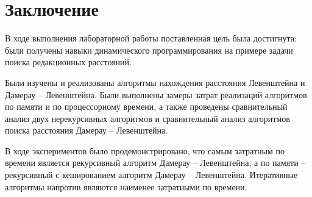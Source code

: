 \chapter*{Заключение}
\thispagestyle{empty}

В ходе выполнения лабораторной работы поставленная цель была достигнута: были получены навыки динамического программирования на примере задачи поиска редакционных расстояний.

Были изучены и реализованы алгоритмы нахождения расстояния Левенштейна и Дамерау -- Левенштейна. Были выполнены замеры затрат реализаций алгоритмов по памяти и по процессорному времени, а также проведены сравнительный анализ двух нерекурсивных алгоритмов и сравнительный анализ алгоритмов поиска расстояния Дамерау -- Левенштейна.

В ходе экспериментов было продемонстрировано, что самым затратным по времени является рекурсивный алгоритм Дамерау -- Левенштейна, а по памяти -- рекурсивный с кешированием алгоритм Дамерау -- Левенштейна. Итеративные алгоритмы напротив являются наименее затратными по времени.